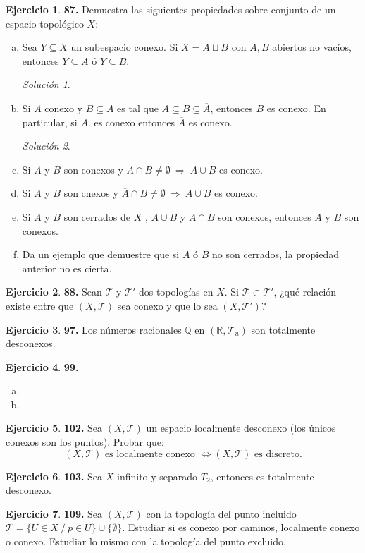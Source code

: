 \documentclass[12pt,twoside]{report}
\newcommand\mc[1]{\mathcal{#1}}
\theoremstyle{azul}
\theoremstyle{azul2}
\theoremstyle{plain}
\theoremstyle{definition}
\newtheorem*{ejer}{Ejercicio}
\theoremstyle{remark}
\newtheorem*{sol}{Solución}
\begin{document}
\begin{ejer}
    \textbf{87.} Demuestra las siguientes propiedades sobre conjunto de un espacio topológico $X$:
    \begin{enumerate}[a)]
        \item Sea $Y \subseteq X$ un subespacio conexo. Si $X=A \sqcup B$ con $A,B$ abiertos no vacíos, entonces $Y \subseteq A$ ó $Y \subseteq B$.
        \begin{sol}
            
        \end{sol}
        \item Si $A$ conexo y $B \subseteq A$ es tal que $A \subseteq B \subseteq \overline{A}$, entonces $B$ es conexo. En particular, si $A$. es conexo entonces $\overline{A}$ es conexo. 
        \begin{sol}
            
        \end{sol}
        \item Si $A$ y $B$ son conexos y $A \cap B \neq \emptyset \: \Rightarrow \: A \cup B$ es conexo. 
        \item Si $A$ y $B$ son cnexos y $\overline{A} \cap B \neq \emptyset \: \Rightarrow \: A \cup B$ es conexo.
        \item Si $A$ y $B$ son cerrados de $X$ , $A\cup B$ y $A\cap B$ son conexos, entonces $A$ y $B$ son conexos.
        \item Da un ejemplo que demuestre que si $A$ ó $B$ no son cerrados, la propiedad anterior no es cierta.
    \end{enumerate}
\end{ejer}
\begin{ejer}
    \textbf{88.} Sean $\mc{T}$ y $\mc{T}'$ dos topologías en $X$. Si $\mc{T} \subset \mc{T}'$, ¿qué relación existe entre que $(X,\mc{T})$ sea conexo y que lo sea $(X,\mc{T}')$?
\end{ejer}
\begin{ejer}
    \textbf{97.} Los números racionales $\mathbb{Q}$ en $(\mathbb{R}, \mc{T}_u)$ son totalmente desconexos.
\end{ejer}
\begin{ejer}
    \textbf{99. }\begin{enumerate}[a)]
        \item 
        \item
    \end{enumerate}
\end{ejer}
\begin{ejer} \textbf{102.}
    Sea $(X, \mc{T})$ un espacio localmente desconexo (los únicos conexos son los puntos).
    Probar que:
    $$(X,\mc{T}) \text{  es localmente conexo } \iff (X,\mc{T})\text{ es discreto.}$$
\end{ejer}
\begin{ejer}
    \textbf{103.} Sea $X$ infinito y separado $T_2$, entonces es totalmente desconexo.
\end{ejer}
\begin{ejer}
    \textbf{109.} Sea $(X,\mc{T})$ con la topología del punto incluido $\mc{T}=\{U \in X\: / \: p \in U\}\cup \{\emptyset\}$. Estudiar si es conexo por caminos, localmente conexo o conexo. Estudiar lo mismo con la topología del punto excluido.
\end{ejer}
\end{document}
